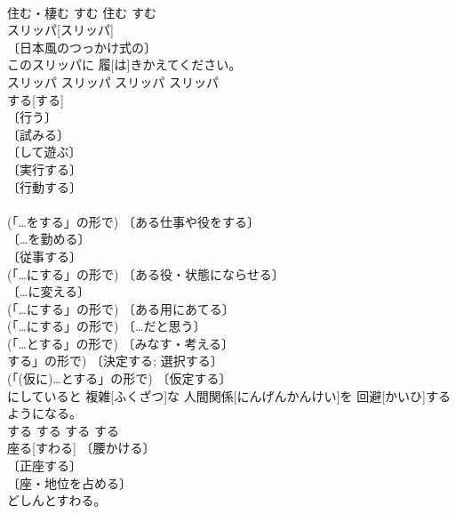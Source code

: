 \documentclass[8pt]{extreport}
\begin{document}
\begin{CJK}{UTF8}{min}
\\	住む・棲む	すむ	住む	すむ	
\\	スリッパ[スリッパ]	
\\	〔日本風のつっかけ式の〕 
\\	このスリッパに 履[は]きかえてください。	
\\	スリッパ	スリッパ	スリッパ	スリッパ	
\\	する[する]	
\\	〔行う〕 
\\	〔試みる〕 
\\	〔して遊ぶ〕 
\\	〔実行する〕 
\\	〔行動する〕 
\\	[⇒やる 
\\	-とする 
\\	させる１] 
\\	(「…をする」の形で) 〔ある仕事や役をする〕 
\\	〔…を勤める〕 
\\	〔従事する〕 
\\	(「…にする」の形で) 〔ある役・状態にならせる〕 
\\	〔…に変える〕 
\\	(「…にする」の形で) 〔ある用にあてる〕 
\\	(「…にする」の形で) 〔…だと思う〕 
\\	(「…とする」の形で) 〔みなす・考える〕 
\\	[⇒-とする 
\\	(「…に[と]する」の形で) 〔決定する; 選択する〕 
\\	(「(仮に)…とする」の形で) 〔仮定する〕 
\\	[⇒-とする 
\\	(「…をする」の形で) 〔装身具を身につける〕 
\\	(「…(を)する」の形で) 〔ある形・状態である〕 
\\	(「…がする」の形で) 〔ある状態や動きが感じられる〕 
\\	〔時が経つ〕 
\\	〔それだけの値段である〕 
\\	コンピューターばかり 相手[あいて]にしていると 複雑[ふくざつ]な 人間関係[にんげんかんけい]を 回避[かいひ]するようになる。	
\\	する	する	する	する	
\\	座る[すわる]	〔腰かける〕 
\\	〔正座する〕 
\\	〔座・地位を占める〕 
\\	どしんとすわる。	

\end{CJK}
\end{document}
